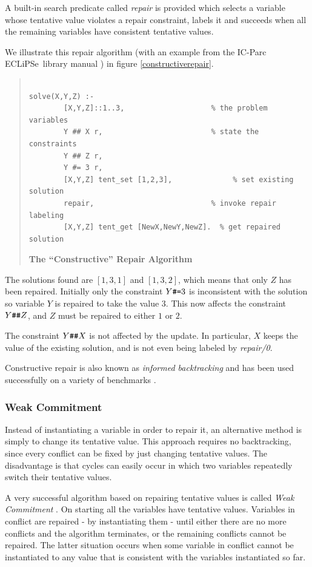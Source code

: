 \documentclass[a4wide]{article}
\newcommand{\ECL}{\mbox{ECLiPSe\ }{\hspace{1mm}}}
\begin{document}
A built-in search predicate called {\em repair} is provided which
selects a variable whose tentative value violates a repair constraint,
labels it and succeeds when all the remaining variables have
consistent tentative values.

We illustrate this repair algorithm (with an example from the IC-Parc
\ECL library manual \cite{eclipseicparc}) in figure
\ref{constructiverepair}.
\begin{quote}
\begin{verbatim}

solve(X,Y,Z) :-
        [X,Y,Z]::1..3,                    % the problem variables
        Y ## X r,                         % state the constraints
        Y ## Z r,
        Y #= 3 r,
        [X,Y,Z] tent_set [1,2,3],              % set existing solution
        repair,                           % invoke repair labeling
        [X,Y,Z] tent_get [NewX,NewY,NewZ].  % get repaired solution
\end{verbatim}
{\bf The ``Constructive'' Repair Algorithm}
\label{constructiverepair}
\end{quote} 
The solutions found are $[1,3,1]$ and $[1,3,2]$, which means that only
$Z$ 
has been repaired.  
Initially only the constraint $Y \verb0#=0 3$ is inconsistent with the
solution 
so variable $Y$ is repaired to take the value $3$.  
This now affects the constraint $Y \verb0##0 Z$, 
and $Z$ must be repaired to either $1$ or $2$.  

The constraint $Y \verb0##0 X$ is not affected by the update. In
particular, $X$
keeps the value of the existing solution, and is 
not even being labeled by {\em repair/0}. 

Constructive repair is also known as {\em informed backtracking} and
has been used successfully on a variety of benchmarks
\cite{minton}. 

\subsubsection{Weak Commitment}
Instead of instantiating a variable in order to repair it, an
alternative method is simply to change its tentative value.
This approach requires no backtracking, since every conflict can be
fixed by just changing tentative values.
The disadvantage is that cycles can easily occur in which two
variables repeatedly switch their tentative values.

A very successful algorithm based on repairing tentative values is
called {\em Weak Commitment} \cite{yokoo}.
On starting all the variables have tentative values.
Variables in conflict are repaired - by instantiating them - until
either there are no more conflicts and the algorithm terminates, or
the remaining conflicts cannot be repaired.
The latter situation occurs when some variable in conflict cannot
be instantiated to any value that is consistent with the variables
instantiated so far.
\end{document}
